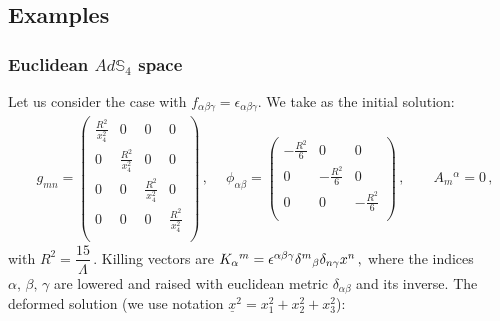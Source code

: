\documentclass[12pt, utf8]{article}
\numberwithin{equation}{section}
\begin{document}
\subsection{Examples}\label{GTRex}
\subsubsection{Euclidean $Ad\mathbb{S}_4$ space}

Let us consider the case with $f_{\alpha \beta \gamma} = \epsilon_{\alpha \beta \gamma} $. We take as the initial solution: 
\begin{equation}
    \begin{aligned}
  &  g_{m n} =     \left(
\begin{array}{cccc}
 \frac{R^2}{x_4^2} & 0 & 0 & 0 \\
 0 & \frac{R^2}{x_4^2} & 0 & 0 \\
 0 & 0 & \frac{R^2}{x_4^2} & 0 \\
 0 & 0 & 0 &  \frac{R^2}{x_4^2} \\
\end{array}
\right) \, , \quad\ \phi_{\alpha \beta} = \left(
\begin{array}{ccc}
- \frac{R^2}{6} & 0 & 0 \\
 0 & -\frac{R^2}{6} & 0 \\
 0 & 0 & -\frac{R^2}{6} \\
\end{array}
\right) \, ,  \qquad A_{m}{}^{\alpha} = 0 \, , 
    \end{aligned}
\end{equation}
with $R^2 = \dfrac{15}{\Lambda} \,$. Killing vectors are $K_{\alpha}{}^{m} = \epsilon^{\alpha \beta \gamma} \delta^{m}{}_{\beta} \delta_{n \gamma} x^{n} \, , $ where the indices $\alpha , \, \beta , \, \gamma$ are lowered and raised with euclidean metric $\delta_{\alpha \beta}$ and its inverse.
The deformed solution (we use notation $\underline{x}^2 = x_1^2+x_2^2+x_3^2$): 
\end{document}
